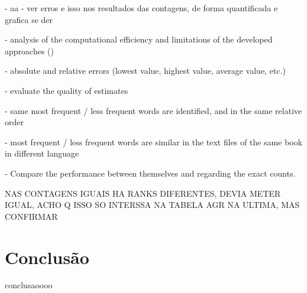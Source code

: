 \documentclass[mirror, portugues]{revdetua}
\begin{document}
- aa - ver erros e isso nos resultados das contagens, de forma quantificada e grafica se der

- analysis of the computational efficiency and limitations of the developed approaches ()

    - absolute and relative errors (lowest value, highest value, average value, etc.)

    - evaluate the quality of estimates

    - same most frequent / less frequent words are identified, and in the same relative order

    - most frequent / less frequent words are similar in the text files of the same book in different language

    - Compare the performance between themselves and regarding the exact counts.

NAS CONTAGENS IGUAIS HA RANKS DIFERENTES, DEVIA METER IGUAL, ACHO Q ISSO SO INTERSSA NA TABELA AGR NA ULTIMA, MAS CONFIRMAR


\section{Conclusão}

conclusaoooo


\end{document}
